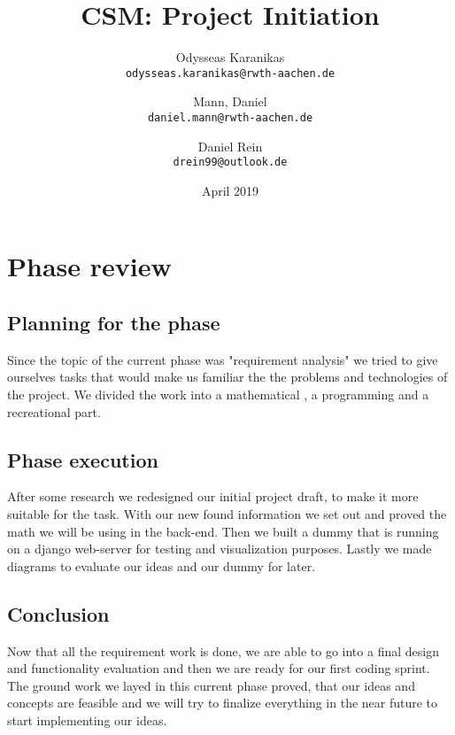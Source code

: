 \documentclass[12pt]{extarticle}
\title{CSM: Project Initiation}
\author{
Odysseas Karanikas\\
\texttt{odysseas.karanikas@rwth-aachen.de}
\and
Mann, Daniel\\
\texttt{daniel.mann@rwth-aachen.de}
\and
Daniel Rein\\
\texttt{drein99@outlook.de}
}
\date{April 2019}
\begin{document}
\maketitle

\section{Phase review}
\subsection{Planning for the phase}
Since the topic of the current phase was "requirement analysis" we tried to give ourselves tasks that would make us familiar the the problems and technologies of the project. We divided the work into a mathematical , a programming and a recreational part.
\subsection{Phase execution}
After some research we redesigned our initial project draft, to make it more suitable for the task. With our new found information we set out and proved the math we will be using in the back-end. Then we built a dummy that is running on a django web-server for testing and visualization purposes. Lastly we made diagrams to evaluate our ideas and our dummy for later.
\subsection{Conclusion}
Now that all the requirement work is done, we are able to go into a final design and functionality evaluation and then we are ready for our first coding sprint. The ground work we layed in this current phase proved, that our ideas and concepts are feasible and we will try to finalize everything in the near future to start implementing our ideas.

\printbibliography
\end{document}
